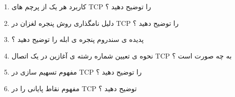 \documentclass{article}
\begin{document}
\begin{enumerate}
\item کاربرد هر یک از پرچم های TCP را توضیح دهید ؟

\item دلیل نامگذاری روش پنجره لغزان در TCP را توضیح دهید ؟

\item پدیده ی سندروم پنجره ی ابله را توضیح دهید ؟

\item نحوه ی تعیین شماره رشته ی آغازین در یک اتصال TCP به چه صورت است ؟

\item مفهوم تسهیم سازی در TCP را توضیح دهید ؟

\item مفهوم نقاط پایانی را در TCP توضیح دهید ؟



\end{enumerate}
\end{document}
